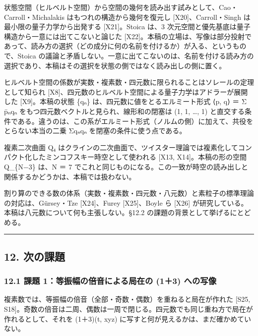 \documentclass[
  a4paper,
]{ltjsarticle}
\begin{document}
状態空間（ヒルベルト空間）から空間の幾何を読み出す試みとして、Cao・Carroll・Michalakis
はもつれの構造から幾何を復元し {[}X20{]}、Carroll・Singh
は最小限の量子力学から出発する {[}X21{]}。Stoica は、3
次元空間と優先基底は量子構造から一意には出てこないと論じた
{[}X22{]}。本稿の立場は、写像は部分投射であって、読み方の選択（どの成分に何の名前を付けるか）が入る、というもので、Stoica
の議論と矛盾しない。一意に出てこないのは、名前を付ける読み方の選択であり、本稿はその選択を状態の側ではなく読み出しの側に置く。

ヒルベルト空間の係数が実数・複素数・四元数に限られることはソレールの定理として知られ
{[}X8{]}、四元数のヒルベルト空間による量子力学はアドラーが展開した
{[}X9{]}。本稿の状態 \{qₙ\} は、四元数に値をとるエルミート形式 ⟨p, q⟩ ＝
Σ p̄ₙqₙ をもつ四元数ベクトルと見られ、線形和の閉塞は (1, 1, \ldots, 1)
と直交する条件である。違うのは、この系がエルミート形式（ノルムの側）に加えて、共役をとらない本当の二乗
Σqₙqₙ を閉塞の条件に使う点である。

複素二次曲面 Q₄
はクラインの二次曲面で、ツイスター理論では複素化してコンパクト化したミンコフスキー時空として使われる
{[}X13, X14{]}。本稿の形の空間 Q\_\{N−3\} は、N ＝ 7
でこれと同じものになる。この一致が時空の読み出しと関係するかどうかは、本稿では扱わない。

割り算のできる数の体系（実数・複素数・四元数・八元数）と素粒子の標準理論の対応は、Gürsey・Tze
{[}X24{]}、Furey {[}X25{]}、Boyle ら {[}X26{]}
が研究している。本稿は八元数について何も主張しない。§12.2
の課題の背景として挙げるにとどめる。

\begin{center}\rule{0.5\linewidth}{0.5pt}\end{center}

\subsection{12. 次の課題}\label{ux6b21ux306eux8ab2ux984c}

\subsubsection{12.1 課題 1：等振幅の倍音による局在の (1＋3)
への写像}\label{ux8ab2ux984c-1ux7b49ux632fux5e45ux306eux500dux97f3ux306bux3088ux308bux5c40ux5728ux306e-13-ux3078ux306eux5199ux50cf}

複素数では、等振幅の倍音（全部・奇数・偶数）を重ねると局在が作れた
{[}S25,
S18{]}。奇数の倍音は二周、偶数は一周で閉じる。四元数でも同じ重ね方で局在が作れるとして、それを
(1＋3)(t, xyz) に写すと何が見えるかは、まだ確かめていない。
\end{document}
